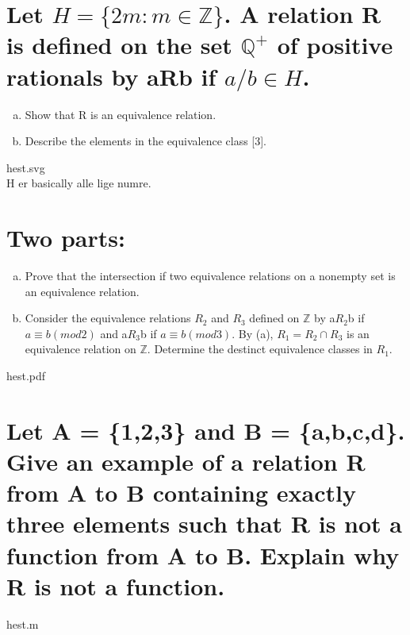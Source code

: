 \section{Let $H = \{2m : m\in \mathbb{Z}\}$. A relation R is defined on the set $\mathbb{Q}^{+}$ of positive rationals by aRb if $a/b\in H$.}
\begin{enumerate}[a.]
\item Show that R is an equivalence relation.
\item Describe the elements in the equivalence class [3].
\end{enumerate}
hest.svg\\
H er basically alle lige numre.

\section{Two parts:}
\begin{enumerate}[a.]
\item Prove that the intersection if two equivalence relations on a nonempty set is an equivalence relation.
\item Consider the equivalence relations $R_2$ and $R_3$ defined on $\mathbb{Z}$ by a$R_2$b if $a\equiv b(mod 2)$ and a$R_3$b if $a\equiv b(mod 3)$. By (a), $R_1=R_2\cap R_3$ is an equivalence relation on $\mathbb{Z}$. Determine the destinct equivalence classes in $R_1$.
\end{enumerate}
hest.pdf

\section{Let A = \{1,2,3\} and B = \{a,b,c,d\}. Give an example of a relation R from A to B containing exactly three elements such that R is not a function from A to B. Explain why R is not a function.}
hest.m

